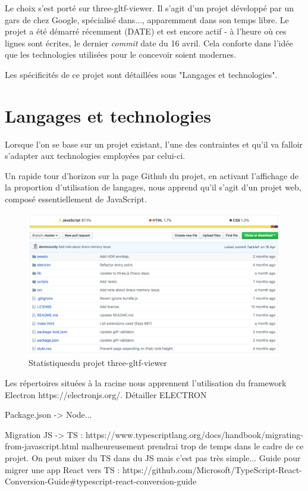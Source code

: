 Le choix s'est porté sur three-gltf-viewer.
Il s'agit d'un projet développé par un gars de chez Google, spécialisé dans...,  apparemment dans son temps libre.
Le projet a été démarré récemment (DATE) et est encore actif - à l'heure où ces lignes sont écrites, le dernier \textit{commit} date du 16 avril. Cela conforte dans l'idée que les technologies utilisées pour le concevoir soient modernes.

Les spécificités de ce projet sont détaillées sous "Langages et technologies".


\section{Langages et technologies}

Lorsque l'on se base sur un projet existant, l'une des contraintes et qu'il va falloir s'adapter aux technologies employées par celui-ci.

Un rapide tour d'horizon sur la page Github du projet, en activant l'affichage de la proportion d'utilisation de langages, nous apprend qu'il s'agit d'un projet web, composé essentiellement de JavaScript.

\begin{figure}[h]
    \centering
    \includegraphics[width=\linewidth]{Figures/three-gltf-viewer-github-preview.png}
    \caption{Statistiquesdu projet three-gltf-viewer}
    \label{fig:three-gltf-viewer-github-preview}
\end{figure}

Les répertoires situées à la racine nous apprennent l'utilisation du framework Electron https://electronjs.org/.
Détailler ELECTRON

Package.json -> Node...

Migration JS -> TS : https://www.typescriptlang.org/docs/handbook/migrating-from-javascript.html
malheureusement prendrai trop de temps dans le cadre de ce projet. On peut mixer du TS dans du JS mais c'est pas très simple...
Guide pour migrer une app React vers TS : https://github.com/Microsoft/TypeScript-React-Conversion-Guide#typescript-react-conversion-guide

